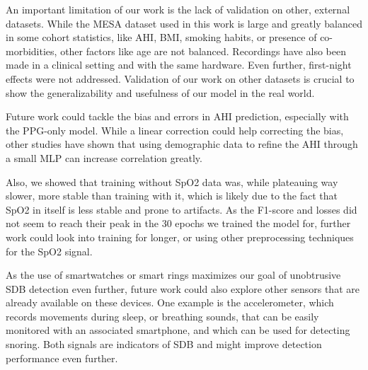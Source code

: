An important limitation of our work is the lack of validation on other, external datasets. While the MESA dataset used in this work is large and greatly balanced in some cohort statistics, like AHI, BMI, smoking habits, or presence of co-morbidities, other factors like age are not balanced. Recordings have also been made in a clinical setting and with the same hardware. Even further, first-night effects were not addressed.
Validation of our work on other datasets is crucial to show the generalizability and usefulness of our model in the real world.


Future work could tackle the bias and errors in AHI prediction, especially with the PPG-only model. While a linear correction could help correcting the bias, other studies have shown that using demographic data to refine the AHI through a small MLP can increase correlation greatly.

Also, we showed that training without SpO2 data was, while plateauing way slower, more stable than training with it, which is likely due to the fact that SpO2 in itself is less stable and prone to artifacts. As the F1-score and losses did not seem to reach their peak in the 30 epochs we trained the model for, further work could look into training for longer, or using other preprocessing techniques for the SpO2 signal.

As the use of smartwatches or smart rings maximizes our goal of unobtrusive SDB detection even further, future work could also explore other sensors that are already available on these devices. One example is the accelerometer, which records movements during sleep, or breathing sounds, that can be easily monitored with an associated smartphone, and which can be used for detecting snoring. Both signals are indicators of SDB and might improve detection performance even further.
